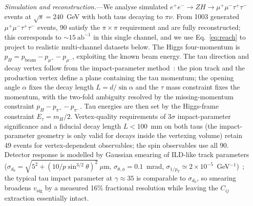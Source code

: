 \documentclass[prl,twocolumn,superscriptaddress,floatfix]{revtex4-2}
\newcommand{\ee}{e^+e^-}
\newcommand{\tautau}{\tau^+\tau^-}
\newcommand{\mumu}{\mu^+\mu^-}
\newcommand{\pinu}{\pi\nu}
\newcommand{\vsig}{v_{\mathrm{sig}}}
\newcommand{\sqrts}{\sqrt{s}}
\begin{document}
\textit{Simulation and reconstruction.}---We analyse simulated
$\ee\to ZH\to\mumu\tautau$ events at $\sqrts=240$~GeV with both taus
decaying to $\pinu$.  From 1003 generated $\mumu\tautau$ events, 90
satisfy the $\pi{\times}\pi$ requirement and are fully reconstructed;
this corresponds to ${\sim}15~\mathrm{ab}^{-1}$ in this single
channel, and we use Eq.~\eqref{eq:reach} to project to realistic
multi-channel datasets below.  The Higgs four-momentum is
$p_H=p_{\mathrm{beam}}-p_{\mu^+}-p_{\mu^-}$, exploiting the known
beam energy.  The tau direction and decay vertex follow from the
impact-parameter method~\cite{Jeans2015}: the pion track and the
production vertex define a plane containing the tau momentum; the
opening angle $\alpha$ fixes the decay length $L=d/\sin\alpha$ and
the $\tau$ mass constraint fixes the momentum, with the two-fold
ambiguity resolved by the missing-momentum constraint
$p_H-p_{\pi^+}-p_{\pi^-}$.  Tau energies are then set by the
Higgs-frame constraint $E_\tau=m_H/2$.  Vertex-quality requirements
of $3\sigma$ impact-parameter significance and a fiducial decay
length $L<100$~mm on both taus (the impact-parameter geometry is only
valid for decays inside the vertexing volume) retain 49 events for
vertex-dependent observables; the spin observables use all 90.  Detector response is modelled by Gaussian smearing of ILD-like
track parameters
($\sigma_{d_0}=\sqrt{5^2+(10/p\sin^{3/2}\theta)^2}~\mu$m,
$\sigma_{\theta,\phi}=0.1$~mrad,
$\sigma_{1/p_T}\simeq2\times10^{-5}$~GeV$^{-1}$)~\cite{ILD_IDR}; the
typical tau impact parameter at $\gamma\approx35$ is comparable to
$\sigma_{d_0}$, so smearing broadens $\vsig$ by a measured 16\%
fractional resolution while leaving the $C_{ij}$ extraction
essentially intact.

\end{document}
